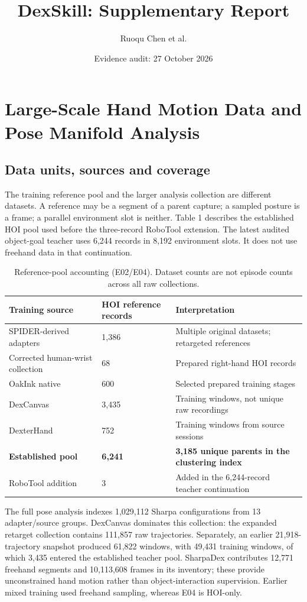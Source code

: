 \documentclass[10pt,twocolumn]{article}
\title{DexSkill: Supplementary Report}
\author{Ruoqu Chen et al.}
\date{Evidence audit: 27 October 2026}
\begin{document}
\maketitle




\section{Large-Scale Hand Motion Data and Pose Manifold Analysis}

\subsection{Data units, sources and coverage}

The training reference pool and the larger analysis collection are different datasets. A reference may be a segment of a parent capture; a sampled posture is a frame; a parallel environment slot is neither. Table 1 describes the established HOI pool used before the three-record RoboTool extension. The latest audited object-goal teacher uses 6,244 records in 8,192 environment slots. It does not use freehand data in that continuation.

\begin{table}[t]
\small
\begin{tabularx}{\textwidth}{@{}lXX@{}}
\toprule
Training source & HOI reference records & Interpretation \\
\midrule
SPIDER-derived adapters & 1,386 & Multiple original datasets; retargeted references \\
Corrected human-wrist collection & 68 & Prepared right-hand HOI records \\
OakInk native & 600 & Selected prepared training stages \\
DexCanvas & 3,435 & Training windows, not unique raw recordings \\
DexterHand & 752 & Training windows from source sessions \\
\textbf{Established pool} & \textbf{6,241} & \textbf{3,185 unique parents in the clustering index} \\
RoboTool addition & 3 & Added in the 6,244-record teacher continuation \\
\bottomrule
\end{tabularx}
\caption{Reference-pool accounting (E02/E04). Dataset counts are not episode counts across all raw collections.}
\end{table}

The full pose analysis indexes 1,029,112 Sharpa configurations from 13 adapter/source groups. DexCanvas dominates this collection: the expanded retarget collection contains 111,857 raw trajectories. Separately, an earlier 21,918-trajectory snapshot produced 61,822 windows, with 49,431 training windows, of which 3,435 entered the established teacher pool. SharpaDex contributes 12,771 freehand segments and 10,113,608 frames in its inventory; these provide unconstrained hand motion rather than object-interaction supervision. Earlier mixed training used freehand sampling, whereas E04 is HOI-only.
\end{document}
